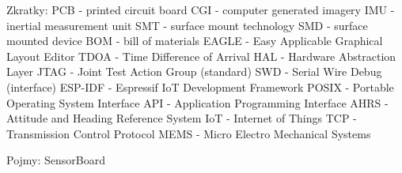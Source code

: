 Zkratky:
PCB - printed circuit board
CGI - computer generated imagery
IMU - inertial measurement unit
SMT - surface mount technology
SMD - surface mounted device
BOM - bill of materials
EAGLE - Easy Applicable Graphical Layout Editor
TDOA - Time Difference of Arrival
HAL - Hardware Abstraction Layer
JTAG - Joint Test Action Group (standard)
SWD - Serial Wire Debug (interface)
ESP-IDF - Espressif IoT Development Framework
POSIX - Portable Operating System Interface
API - Application Programming Interface
AHRS - Attitude and Heading Reference System
IoT - Internet of Things
TCP - Transmission Control Protocol
MEMS - Micro Electro Mechanical Systems

Pojmy:
SensorBoard